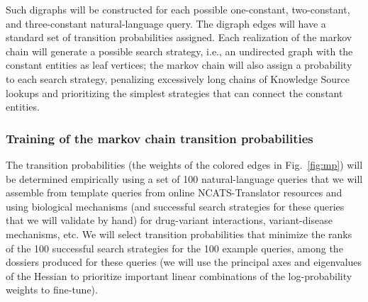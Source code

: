 \documentclass[11pt,notitlepage]{article}
\begin{document}
Such digraphs will be constructed for each possible one-constant, two-constant,
and three-constant natural-language query. The digraph edges will have a
standard set of transition probabilities assigned. Each realization of the
markov chain will generate a possible search strategy, i.e., an undirected graph
with the constant entities as leaf vertices; the markov chain will also
assign a probability to each search strategy, penalizing excessively long chains
of Knowledge Source lookups and prioritizing the simplest strategies that can
connect the constant entities.

\subsubsection{Training of the markov chain transition probabilities}
The transition probabilities (the weights of the
colored edges in Fig.~\ref{fig:mp}) will be determined empirically using a set
of 100 natural-language queries that we will assemble from template queries from
online NCATS-Translator resources and using biological mechanisms (and
successful search strategies for these queries that we will validate by hand)
for drug-variant interactions, variant-disease mechanisms, etc. We will select
transition probabilities that minimize the ranks of the 100 successful search
strategies for the 100 example queries, among the dossiers produced for these
queries (we will use the principal axes and eigenvalues of the Hessian to
prioritize important linear combinations of the log-probability weights to
fine-tune).
\end{document}
